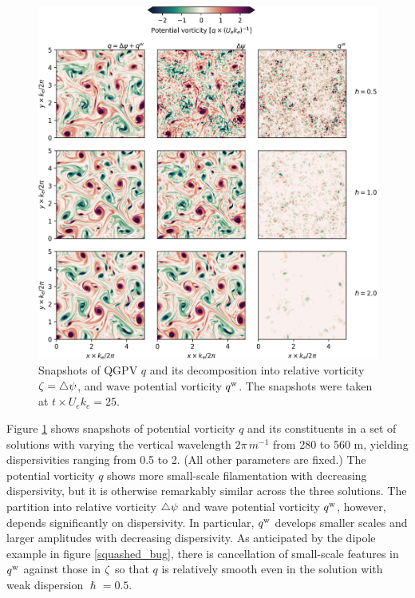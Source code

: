 \documentclass{jfm}
\begin{document}
 \begin{figure}
 \centering
 \includegraphics[width=1.\textwidth]{figs/fig5.png}
 \caption{Snapshots of QGPV $q$ and its
          decomposition into relative vorticity $\zeta = \triangle\psi$, and wave
          potential vorticity $q^{\mathrm{w}}$. The snapshots were taken at $t\times U_e k_e =25$.
         }  \label{pv-terms_turb}
 \end{figure}

Figure \ref{pv-terms_turb} shows snapshots of potential vorticity $q$ and its constituents  in a set of solutions with varying the vertical wavelength
$2\pi\,m^{-1}$ from 280 to 560 m, yielding dispersivities ranging from 0.5 to 2.
(All other parameters are fixed.) The potential vorticity $q$ shows more small-scale
filamentation with decreasing dispersivity, but it is otherwise remarkably similar across
the three solutions. The partition into relative vorticity $\triangle\psi$ and wave potential
vorticity $q^{\mathrm{w}}$, however, depends significantly on dispersivity. In particular,
$q^{\mathrm{w}}$ develops smaller scales and larger amplitudes with decreasing dispersivity.
As anticipated by the dipole example in figure \ref{squashed_bug}, there is  cancellation of small-scale features in $q^{\mathrm{w}}$ against those in  $\zeta$ so that  $q$ is relatively smooth even in the solution with  weak dispersion $\hslash=0.5$.
\end{document}

